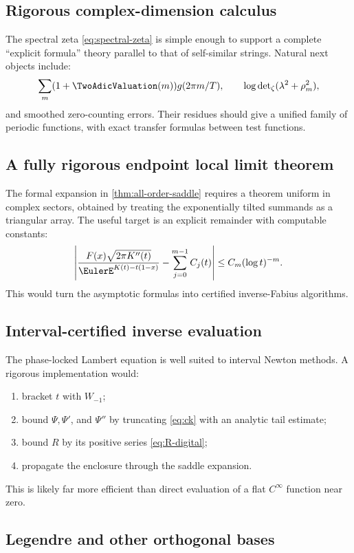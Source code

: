 \documentclass[11pt,oneside]{article}
\theoremstyle{definition}
\theoremstyle{remark}
\begin{document}
\subsection{Rigorous complex-dimension calculus}

The spectral zeta \eqref{eq:spectral-zeta} is simple enough to support a
complete ``explicit formula'' theory parallel to that of self-similar
strings.  Natural next objects include:
\[
 \sum_m(1+\TwoAdicValuation(m))g(2\pi m/T),
 \qquad
 \log\det\nolimits_\zeta(\lambda^2+\rho_m^2),
\]
and smoothed zero-counting errors.  Their residues should give a unified
family of periodic functions, with exact transfer formulas between test
functions.

\subsection{A fully rigorous endpoint local limit theorem}

The formal expansion in \cref{thm:all-order-saddle} requires a theorem uniform
in complex sectors, obtained by treating the exponentially tilted summands as
a triangular array.  The useful target is an explicit remainder with
computable constants:
\[
 \left|
 \frac{F(x)\sqrt{2\pi K''(t)}}
      {\EulerE^{K(t)-t(1-x)}}
 -\sum_{j=0}^{m-1}C_j(t)
 \right|
 \leq C_m(\log t)^{-m}.
\]
This would turn the asymptotic formulas into certified inverse-Fabius
algorithms.

\subsection{Interval-certified inverse evaluation}

The phase-locked Lambert equation is well suited to interval Newton methods.
A rigorous implementation would:
\begin{enumerate}[label=\arabic*.,leftmargin=2em]
\item bracket \(t\) with \(W_{-1}\);
\item bound \(\Psi,\Psi'\), and \(\Psi''\) by truncating
      \eqref{eq:ck} with an analytic tail estimate;
\item bound \(R\) by its positive series \eqref{eq:R-digital};
\item propagate the enclosure through the saddle expansion.
\end{enumerate}
This is likely far more efficient than direct evaluation of a flat
\(C^\infty\) function near zero.

\subsection{Legendre and other orthogonal bases}
\end{document}
